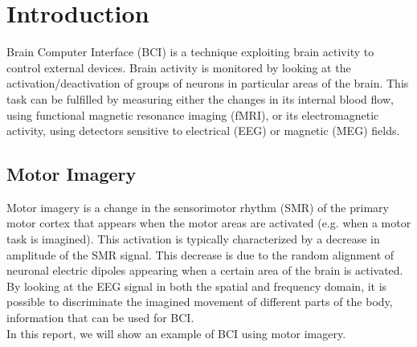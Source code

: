 \section{Introduction}
Brain Computer Interface (BCI) is a technique exploiting brain activity to control external devices.
Brain activity is monitored by looking at the activation/deactivation of groups of neurons in particular areas of the brain.
This task can be fulfilled by measuring either the changes in its internal blood flow, using functional magnetic resonance imaging (fMRI), or its electromagnetic activity, using detectors sensitive to electrical (EEG) or magnetic (MEG) fields.
\subsection{Motor Imagery}
Motor imagery is a change in the sensorimotor rhythm (SMR) of the primary motor cortex that appears when the motor areas are activated (e.g. when a motor task is imagined).
This activation is typically characterized by a decrease in amplitude of the SMR signal.
This decrease is due to the random alignment of neuronal electric dipoles appearing when a certain area of the brain is activated.
By looking at the EEG signal in both the spatial and frequency domain, it is possible to discriminate the imagined movement of different parts of the body, information that can be used for BCI. \\
In this report, we will show an example of BCI using motor imagery.

